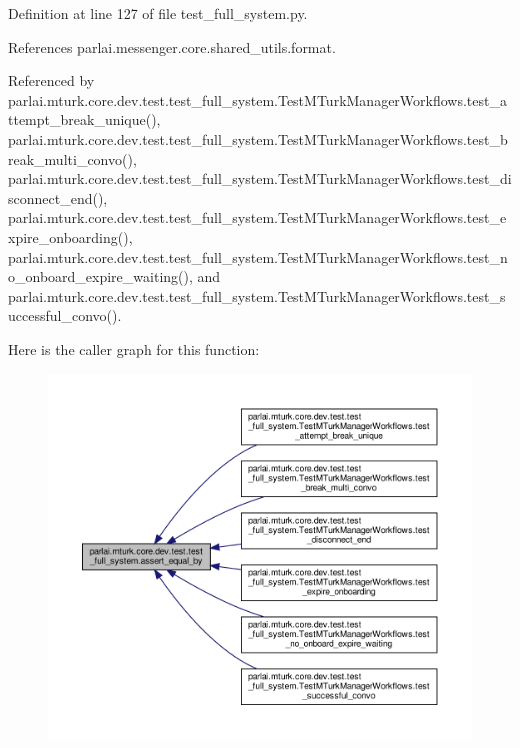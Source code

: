 Definition at line 127 of file test\+\_\+full\+\_\+system.\+py.



References parlai.\+messenger.\+core.\+shared\+\_\+utils.\+format.



Referenced by parlai.\+mturk.\+core.\+dev.\+test.\+test\+\_\+full\+\_\+system.\+Test\+M\+Turk\+Manager\+Workflows.\+test\+\_\+attempt\+\_\+break\+\_\+unique(), parlai.\+mturk.\+core.\+dev.\+test.\+test\+\_\+full\+\_\+system.\+Test\+M\+Turk\+Manager\+Workflows.\+test\+\_\+break\+\_\+multi\+\_\+convo(), parlai.\+mturk.\+core.\+dev.\+test.\+test\+\_\+full\+\_\+system.\+Test\+M\+Turk\+Manager\+Workflows.\+test\+\_\+disconnect\+\_\+end(), parlai.\+mturk.\+core.\+dev.\+test.\+test\+\_\+full\+\_\+system.\+Test\+M\+Turk\+Manager\+Workflows.\+test\+\_\+expire\+\_\+onboarding(), parlai.\+mturk.\+core.\+dev.\+test.\+test\+\_\+full\+\_\+system.\+Test\+M\+Turk\+Manager\+Workflows.\+test\+\_\+no\+\_\+onboard\+\_\+expire\+\_\+waiting(), and parlai.\+mturk.\+core.\+dev.\+test.\+test\+\_\+full\+\_\+system.\+Test\+M\+Turk\+Manager\+Workflows.\+test\+\_\+successful\+\_\+convo().

Here is the caller graph for this function\+:
\nopagebreak
\begin{figure}[H]
\begin{center}
\leavevmode
\includegraphics[width=350pt]{namespaceparlai_1_1mturk_1_1core_1_1dev_1_1test_1_1test__full__system_a08d3f9d5e50fd752ba609ce51013e4ce_icgraph}
\end{center}
\end{figure}


